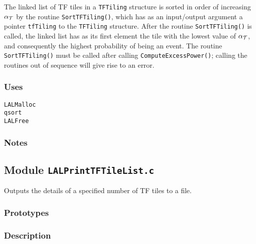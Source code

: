 The linked list of TF tiles in a \verb+TFTiling+ structure is sorted in order
of increasing $\alpha_{\cal T}$ by the routine \verb+SortTFTiling()+, which
has as an input/output argument a pointer \verb+tfTiling+ to the
\verb+TFTiling+ structure.  After the routine \verb+SortTFTiling()+ is called,
the linked list has as its first element the tile with the lowest value of
$\alpha_{\cal T}$, and consequently the highest probability of being an event.
The routine \verb+SortTFTiling()+ must be called after calling
\verb+ComputeExcessPower()+; calling the routines out of sequence will give
rise to an error.

\subsubsection*{Uses}
\begin{verbatim}
LALMalloc
qsort
LALFree
\end{verbatim}

\subsubsection*{Notes}

\vfill{\footnotesize}

\newpage
\subsection{Module \texttt{LALPrintTFTileList.c}}
\label{ss:LALPrintTFTileList.c}

Outputs the details of a specified number of TF tiles to a file.

\subsubsection*{Prototypes}
\vspace{0.1in}


\subsubsection*{Description}

